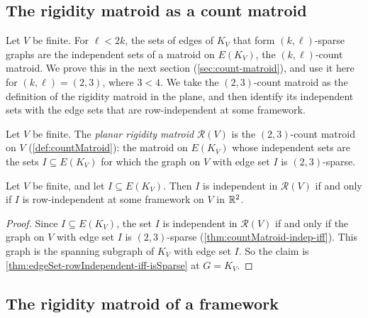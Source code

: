 \subsection{The rigidity matroid as a count matroid}
\label{sec:rigidity-matroid-instance}

Let $V$ be finite. For $\ell < 2k$, the sets of edges of $K_V$ that
form $(k, \ell)$-sparse graphs are the independent sets of a matroid on
$E(K_V)$, the $(k, \ell)$-count matroid. We prove this in the next
section (\cref{sec:count-matroid}), and use it here for
$(k, \ell) = (2, 3)$, where $3 < 4$. We take the $(2, 3)$-count matroid
as the definition of the rigidity matroid in the plane, and then
identify its independent sets with the edge sets that are
row-independent at some framework.

\begin{definition}
  \label{def:rigidityMatroid}
  \leanok
  Let $V$ be finite. The \emph{planar rigidity matroid} $\mathcal{R}(V)$
  is the $(2, 3)$-count matroid on $V$ (\cref{def:countMatroid}): the
  matroid on $E(K_V)$ whose independent sets are the sets
  $I \subseteq E(K_V)$ for which the graph on $V$ with edge set $I$ is
  $(2, 3)$-sparse.
\end{definition}

\begin{theorem}
  \label{thm:rigidityMatroid-indep-iff-rowIndependent}
  \leanok
  Let $V$ be finite, and let $I \subseteq E(K_V)$. Then $I$ is
  independent in $\mathcal{R}(V)$ if and only if $I$ is row-independent
  at some framework on $V$ in ${\mathbb{R}}^{2}$.
\end{theorem}
\begin{proof}
  \leanok
  Since $I \subseteq E(K_V)$, the set $I$ is independent in
  $\mathcal{R}(V)$ if and only if the graph on $V$ with edge set $I$ is
  $(2, 3)$-sparse (\cref{thm:countMatroid-indep-iff}). This graph is
  the spanning subgraph of $K_V$ with edge set $I$. So the claim is
  \cref{thm:edgeSet-rowIndependent-iff-isSparse} at $G = K_V$.
\end{proof}

\subsection{The rigidity matroid of a framework}
\label{sec:rigidity-matroid-linear-framing}

